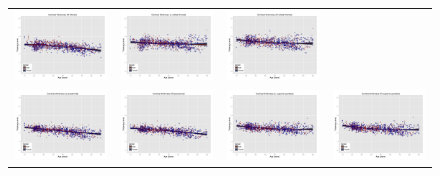 \begin{figure}
\begin{tabular}{cccc}
  \includegraphics[width=35mm]{Figures/label22_results.pdf} &
  \includegraphics[width=35mm]{Figures/label23_results.pdf} &
  \includegraphics[width=35mm]{Figures/label24_results.pdf} \\
  \includegraphics[width=35mm]{Figures/label25_results.pdf} &
  \includegraphics[width=35mm]{Figures/label26_results.pdf} &
  \includegraphics[width=35mm]{Figures/label27_results.pdf} &
  \includegraphics[width=35mm]{Figures/label28_results.pdf} \\

\end{tabular}
\end{figure}
